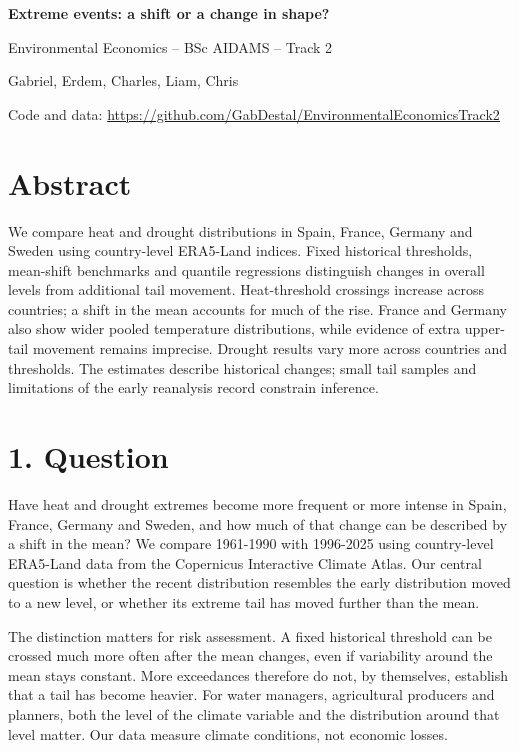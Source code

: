 \documentclass[
  10pt,
]{article}
\author{}
\date{}
\begin{document}
\begin{center}
{\LARGE\bfseries Extreme events: a shift or a change in shape?\par}
\vspace{6pt}
{\small Environmental Economics -- BSc AIDAMS -- Track 2\par}
\vspace{2pt}
{\small {Gabriel, Erdem, Charles, Liam, Chris}\par}
\vspace{2pt}
{\small Code and data: \url{https://github.com/GabDestal/EnvironmentalEconomicsTrack2}\par}
\end{center}


\section*{Abstract}\label{abstract}

We compare heat and drought distributions in Spain, France, Germany and
Sweden using country-level ERA5-Land indices. Fixed historical
thresholds, mean-shift benchmarks and quantile regressions distinguish
changes in overall levels from additional tail movement. Heat-threshold
crossings increase across countries; a shift in the mean accounts for
much of the rise. France and Germany also show wider pooled temperature
distributions, while evidence of extra upper-tail movement remains
imprecise. Drought results vary more across countries and thresholds.
The estimates describe historical changes; small tail samples and
limitations of the early reanalysis record constrain inference.

\section{1. Question}\label{question}

Have heat and drought extremes become more frequent or more intense in
Spain, France, Germany and Sweden, and how much of that change can be
described by a shift in the mean? We compare 1961-1990 with 1996-2025
using country-level ERA5-Land data from the Copernicus Interactive
Climate Atlas. Our central question is whether the recent distribution
resembles the early distribution moved to a new level, or whether its
extreme tail has moved further than the mean.

The distinction matters for risk assessment. A fixed historical
threshold can be crossed much more often after the mean changes, even if
variability around the mean stays constant. More exceedances therefore
do not, by themselves, establish that a tail has become heavier. For
water managers, agricultural producers and planners, both the level of
the climate variable and the distribution around that level matter. Our
data measure climate conditions, not economic losses.
\end{document}

